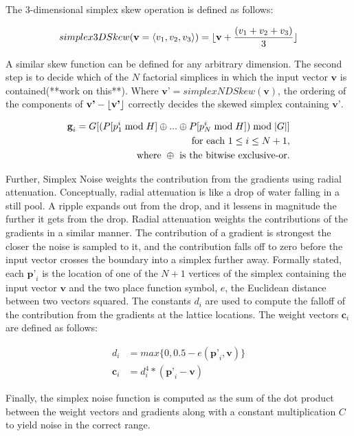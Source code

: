 \documentclass[12pt]{article}
\theoremstyle{definition}
\theoremstyle{remark}
\DeclarePairedDelimiter\floor{\lfloor}{\rfloor}
\begin{document}
The 3-dimensional simplex skew operation is defined as follows:

\begin{equation*}
simplex3DSkew(\textbf{v}=\langle v_1, v_2, v_3 \rangle) = \floor{\textbf{v} + \frac{(v_1 + v_2 + v_3)}{3}}
\end{equation*}

A similar skew function can be defined for any arbitrary dimension. The second step is to decide which of the $N$ factorial simplices in which the input vector $\textbf{v}$ is contained(**work on this**). Where $\textbf{v'}=simplexNDSkew(\textbf{v})$, the ordering of the components of $\textbf{v'} - \floor{\textbf{v'}}$ correctly decides the skewed simplex containing $\textbf{v'}$. 

\begin{align*}
	\textbf{g}_i=G[(P[p^i_1  \; \textnormal{mod} \; H] \oplus ... \oplus P[p^i_{N}  \; \textnormal{mod} \; H]) \; \textnormal{mod} \; |G|] \\
	\textnormal{for each } 1 \leq i \leq N+1, \\
	\textnormal{where } \oplus \textnormal{ is the bitwise exclusive-or.}
\end{align*}

Further, Simplex Noise weights the contribution from the gradients using radial attenuation. Conceptually, radial attenuation is like a drop of water falling in a still pool. A ripple expands out from the drop, and it lessens in magnitude the further it gets from the drop. Radial attenuation weights the contributions of the gradients in a similar manner. The contribution of a gradient is strongest the closer the noise is sampled to it, and the contribution falls off to zero before the input vector crosses the boundary into a simplex further away. Formally stated, each $\textbf{p'}_i$ is the location of one of the $N+1$ vertices of the simplex containing the input vector $\textbf{v}$ and the two place function symbol, $e$, the Euclidean distance between two vectors squared. The constants $d_i$ are used to compute the falloff of the contribution from the gradients at the lattice locations. The weight vectors $\textbf{c}_i$ are defined as follows:

\begin{align*}
d_i &= max\{0, 0.5-e(\textbf{p'}_i,\textbf{v})\} \\
\textbf{c}_i &= d_i^4 * (\textbf{p'}_i - \textbf{v})
\end{align*}

Finally, the simplex noise function is computed as the sum of the dot product between the weight vectors and gradients along with a constant multiplication $C$ to yield noise in the correct range. 
\end{document}
